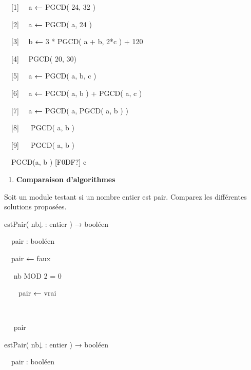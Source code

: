 {\sffamily
{}}


\bigskip

{\sffamily
\ \ [1] \ \ a {\textbf{←}} PGCD( 24, 32 )}

{\sffamily
\ \ [2] \ \ a {\textbf{←}} PGCD( a, 24 )}

{\sffamily
\ \ [3] \ \ b {\textbf{←}} 3 * PGCD( a + b, 2*c
) + 120}

{\sffamily
\ \ [4] \ \ PGCD( 20, 30)}

{\sffamily
\ \ [5] \ \ a {\textbf{←}} PGCD( a, b, c )}

{\sffamily
\ \ [6] \ \ a {\textbf{←}} PGCD( a, b ) + PGCD(
a, c )}

{\sffamily
\ \ [7] \ \ a {\textbf{←}} PGCD( a, PGCD( a, b )
)}

{\sffamily
\ \ [8] \ \  PGCD( a, b )}

{\sffamily
\ \ [9] \ \  PGCD( a, b
)}

{\sffamily
[10] \ \ PGCD(a, b )
{\textrm{[F0DF?]}}{ }c}


\bigskip

\liststyleExercice
\setcounter{saveenum}{\value{enumi}}
\begin{enumerate}
\setcounter{enumi}{\value{saveenum}}
\item {\sffamily\bfseries
Comparaison d'algorithmes}
\end{enumerate}
{
Soit un module testant si un nombre entier est pair. Comparez les
différentes solutions proposées.}

{\sffamily
{} estPair( nb{↓ :} entier
) {→} booléen}

{\sffamily
\ \ pair : booléen}

{\sffamily
\ \ pair {\textbf{←}}{
faux}}

{\sffamily
\ \  nb MOD 2 = 0 }

{\sffamily
\ \ \ \ pair
{\textbf{←}}{ vrai}}

{\sffamily
\ \  }

{\sffamily
\ \  pair}

{\sffamily
{} }


\bigskip

{\sffamily
{} estPair( nb{↓ :} entier
) {→} booléen}

{\sffamily
\ \ pair : booléen}

